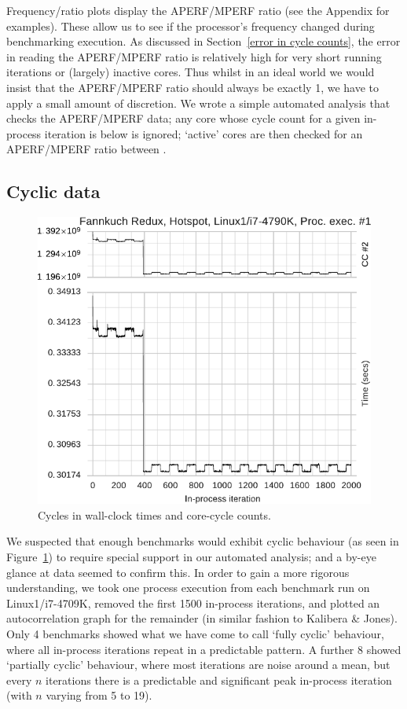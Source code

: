 \documentclass[preprint,numbers,10pt]{sigplanconf}
\newcommand{\kalibera}{Kalibera \& Jones\xspace}
\newcommand{\bencherthree}{Linux1/i7-4709K\xspace}
\begin{document}
Frequency/ratio plots display the APERF/MPERF ratio (see the Appendix for
examples). These allow us to see if the processor's frequency changed during
benchmarking execution. As discussed in Section~\ref{error in cycle counts}, the
error in reading the APERF/MPERF ratio is relatively high for very short running
iterations or (largely) inactive cores. Thus whilst in an ideal world we would
insist that the APERF/MPERF ratio should always be exactly 1, we have to apply a
small amount of discretion. We wrote a simple automated analysis that checks the
APERF/MPERF data; any core whose cycle count for a given in-process iteration is
below  is ignored; `active' cores are then checked for an
APERF/MPERF ratio between .


\subsection{Cyclic data}

\begin{figure}[tbp]
\centering
\includegraphics[width=.45\textwidth]{examples/new_cyclic.pdf}
\caption{Cycles in wall-clock times and core-cycle counts.}
\label{fig:examples:cycles}
\end{figure}

We suspected that enough benchmarks
would exhibit cyclic behaviour (as seen in Figure~\ref{fig:examples:cycles}) to
require special support in our automated analysis; and a by-eye glance at
data seemed to confirm this. In order to gain a more rigorous
understanding, we took one process
execution from each benchmark run on \bencherthree, removed the first 1500
in-process iterations, and plotted an autocorrelation graph for the remainder
(in similar fashion to \kalibera). Only 4 benchmarks showed what we have come to
call `fully cyclic' behaviour, where all in-process iterations repeat in a
predictable pattern. A further 8 showed `partially cyclic' behaviour, where
most iterations are noise around a mean, but every $n$ iterations there is a
predictable and significant peak in-process iteration (with $n$ varying from 5
to 19).
\end{document}
